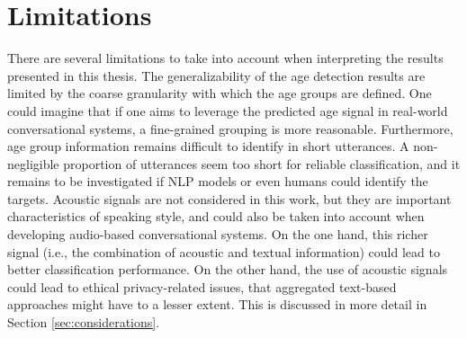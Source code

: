 
\section{Limitations}\label{sec:limitations}


There are several limitations to take into account when interpreting the results presented in this thesis. The generalizability of the age detection results are limited by the coarse granularity with which the age groups are defined. One could imagine that if one aims to leverage the predicted age signal in real-world conversational systems, a fine-grained grouping is more reasonable. Furthermore, age group information remains difficult to identify in short utterances. A non-negligible proportion of utterances seem too short for reliable classification, and it remains to be investigated if NLP models or even humans could identify the targets.
Acoustic signals are not considered in this work, but they are important characteristics of speaking style, and could also be taken into account when developing audio-based conversational systems. On the one hand, this richer signal (i.e., the combination of acoustic and textual information) could lead to better classification performance. On the other hand, the use of acoustic signals could lead to ethical privacy-related issues, that aggregated text-based approaches might have to a lesser extent. 
This is discussed in more detail in Section \ref{sec:considerations}.

